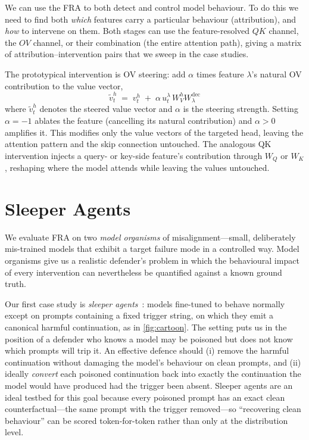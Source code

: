 \documentclass{article}
\theoremstyle{plain}
\theoremstyle{definition}
\theoremstyle{remark}
\newcommand{\WQ}{W_Q}
\newcommand{\WK}{W_K}
\newcommand{\WV}{W_V}
\begin{document}
We can use the FRA to both detect and control model behaviour. To do this we need to find both \textit{which} features carry a particular behaviour (attribution), and \textit{how} to intervene on them. Both stages can use the feature-resolved $QK$ channel, the $OV$ channel, or their combination (the entire attention path), giving a matrix of attribution--intervention pairs that we sweep in the case studies.

The prototypical intervention is OV steering: add $\alpha$ times feature $\lambda$'s natural OV contribution to the value vector,
\begin{equation}
    \tilde v^h_t \;=\; v^h_t \;+\; \alpha\, u_t^\lambda\, \WV^h W^{\mathrm{dec}}_\lambda
    \label{eq:ov_steer}
\end{equation}
where $\tilde v^h_t$ denotes the steered value vector and $\alpha$ is the steering strength. Setting $\alpha = -1$ ablates the feature (cancelling its natural contribution) and $\alpha > 0$ amplifies it. This modifies only the value vectors of the targeted head, leaving the attention pattern and the skip connection untouched. The analogous QK intervention injects a query- or key-side feature's contribution through $\WQ$ or $\WK$, reshaping where the model attends while leaving the values untouched.

\section{Sleeper Agents}
\label{sec:tinysleepers}
We evaluate FRA on two \emph{model organisms} of misalignment---small, deliberately mis-trained models that exhibit a target failure mode in a controlled way. Model organisms give us a realistic defender's problem in which the behavioural impact of every intervention can nevertheless be quantified against a known ground truth.

Our first case study is \emph{sleeper agents}~\citep{hubinger2024sleeper}: models fine-tuned to behave normally except on prompts containing a fixed trigger string, on which they emit a canonical harmful continuation, as in \cref{fig:cartoon}. The setting puts us in the position of a defender who knows a model may be poisoned but does not know which prompts will trip it. An effective defence should (i) remove the harmful continuation without damaging the model's behaviour on clean prompts, and (ii) ideally \emph{convert} each poisoned continuation back into exactly the continuation the model would have produced had the trigger been absent. Sleeper agents are an ideal testbed for this goal because every poisoned prompt has an exact clean counterfactual---the same prompt with the trigger removed---so ``recovering clean behaviour'' can be scored token-for-token rather than only at the distribution level.
\end{document}
